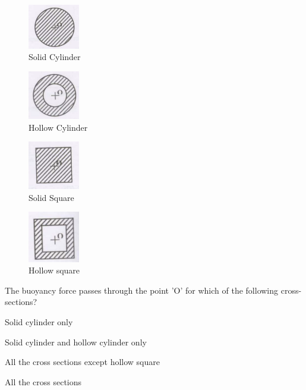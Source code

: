 \documentclass[12pt]{article}
\begin{document}
\begin{enumerate}
    
\begin{figure}[H]
\centering
  \includegraphics[width=0.2\textwidth]{figs/ass1_d_q6_1.png}
  \caption{Solid Cylinder}
\end{figure} 
\begin{figure}[H]
\centering
  \includegraphics[width=0.2\textwidth]{figs/ass1_d_q6_2.png}
  \caption{Hollow Cylinder}
  \end{figure} 
\begin{figure}[H]
\centering
  \includegraphics[width=0.2\textwidth]{figs/ass1_d_q6_3.png}
  \caption{Solid Square}
  \end{figure} 
\begin{figure}[H]
  \centering
  \includegraphics[width=0.2\textwidth]{figs/ass1_d_q6_4.png}
  \caption{Hollow square}
\end{figure}

The buoyancy force passes through the point 'O' for which of the following cross-sections?

\begin{enumerate}
\begin{multicols}{2}
\item  Solid cylinder only 
\item  Solid cylinder and hollow cylinder \newline only 
\item  All the cross sections except hollow square 
\item  All the cross sections
\end{multicols}
\end{enumerate}


\end{enumerate}
\end{document}
